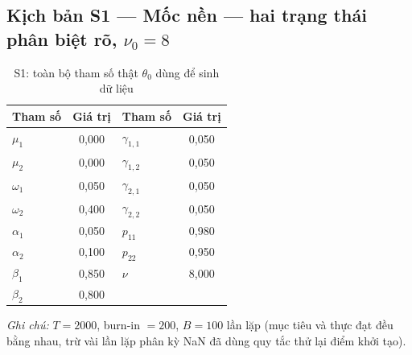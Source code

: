 \documentclass[11pt,a4paper]{article}
\begin{document}
\subsection*{Kịch bản S1 --- Mốc nền --- hai trạng thái phân biệt rõ, $\nu_0=8$}
\begin{table}[H]\centering\small
\caption{S1: toàn bộ tham số thật $\theta_0$ dùng để sinh dữ liệu}
\begin{tabularx}{\textwidth}{l C  l C}
\toprule
\textbf{Tham số} & \textbf{Giá trị} & \textbf{Tham số} & \textbf{Giá trị} \\
\midrule
$\mu_1$ & 0,000 & $\gamma_{1,1}$ & 0,050 \\
$\mu_2$ & 0,000 & $\gamma_{1,2}$ & 0,050 \\
$\omega_1$ & 0,050 & $\gamma_{2,1}$ & 0,050 \\
$\omega_2$ & 0,400 & $\gamma_{2,2}$ & 0,050 \\
$\alpha_1$ & 0,050 & $p_{11}$ & 0,980 \\
$\alpha_2$ & 0,100 & $p_{22}$ & 0,950 \\
$\beta_1$ & 0,850 & $\nu$ & 8,000 \\
$\beta_2$ & 0,800 &  &  \\
\bottomrule
\end{tabularx}
\vspace{0.2em}\raggedright\scriptsize \emph{Ghi chú:} $T=2000$, burn-in $=200$, $B=100$ lần lặp (mục tiêu và thực đạt đều bằng nhau, trừ vài lần lặp phân kỳ NaN đã dùng quy tắc thử lại điểm khởi tạo).
\end{table}
\end{document}
